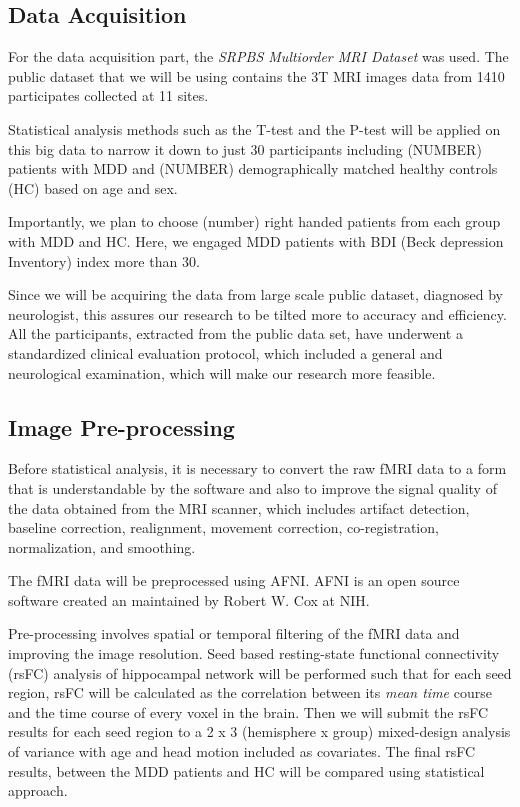 \documentclass{article}
\begin{document}
\subsection{Data Acquisition}

For the data acquisition part, the \textit{SRPBS Multiorder MRI
Dataset} was used. The public dataset that we will be using contains
the 3T MRI images data from 1410 participates collected at 11 sites.

Statistical analysis methods such as the T-test and the P-test will be
applied on this big data to narrow it down to just 30 participants
including (NUMBER) patients with MDD and (NUMBER) demographically
matched healthy controls (HC) based on age and sex.

Importantly, we plan to choose (number) right handed patients from
each group with MDD and HC. Here, we engaged MDD patients with BDI
(Beck depression Inventory) index more than 30.

Since we will be acquiring the data from large scale public dataset,
diagnosed by neurologist, this assures our research to be tilted more
to accuracy and efficiency. All the participants, extracted from the
public data set, have underwent a standardized clinical evaluation
protocol, which included a general and neurological examination, which
will make our research more feasible.

\subsection{Image Pre-processing}

Before statistical analysis, it is necessary to convert the raw fMRI
data to a form that is understandable by the software and also to
improve the signal quality of the data obtained from the MRI scanner,
which includes artifact detection, baseline correction, realignment,
movement correction, co-registration, normalization, and smoothing.

The fMRI data will be preprocessed using AFNI. AFNI is an open source
software created an maintained by Robert W. Cox at NIH.

Pre-processing involves spatial or temporal filtering of the fMRI data
and improving the image resolution. Seed based resting-state
functional connectivity (rsFC) analysis of hippocampal network will be
performed such that for each seed region, rsFC will be calculated as
the correlation between its \textit{mean time} course and the time
course of every voxel in the brain. Then we will submit the rsFC
results for each seed region to a 2 x 3 (hemisphere x group)
mixed-design analysis of variance with age and head motion included as
covariates. The final rsFC results, between the MDD patients and HC
will be compared using statistical approach.
\end{document}
